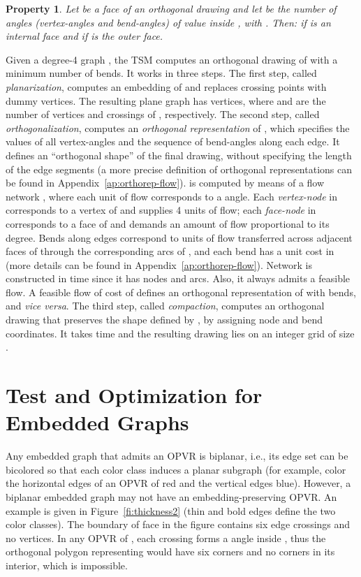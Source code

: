 \documentclass{article}
\newtheorem{property}{Property}
\newcommand{\opvr}{OPVR\xspace}
\begin{document}
\begin{property}\label{pr:face}
Let  be a face of an orthogonal drawing and let  be the number of angles (vertex-angles and bend-angles) of value  inside , with . Then:
 if  is an internal face and  if  is the outer face.
\end{property}

Given a degree-4 graph , the TSM computes an orthogonal drawing  of  with a minimum number of bends. It works in three steps. The first step, called \emph{planarization}, computes an embedding of  and replaces crossing points with dummy vertices. The resulting plane graph  has  vertices, where  and  are the number of vertices and crossings of , respectively. The second step, called \emph{orthogonalization}, computes an \emph{orthogonal representation}  of , which specifies the values of all vertex-angles and the sequence of bend-angles along each edge. It defines an ``orthogonal shape'' of the final drawing, without specifying the length of the edge segments (a more precise definition of orthogonal representations can be found in Appendix~\ref{ap:orthorep-flow}).  is computed by means of a flow network , where each unit of flow corresponds to a  angle. Each \emph{vertex-node} in  corresponds to a vertex of  and  supplies 4 units of flow; each \emph{face-node} in  corresponds to a face of  and demands an amount of flow proportional to its degree. Bends along edges correspond to units of flow transferred across adjacent faces of  through the corresponding arcs of , and each bend has a unit cost in  (more details can be found in Appendix~\ref{ap:orthorep-flow}). Network  is constructed in  time since it has  nodes and arcs. Also, it always admits a feasible flow. A feasible flow  of cost  of  defines an orthogonal representation  of  with  bends, and \emph{vice versa}. The third step, called \emph{compaction}, computes an orthogonal drawing that preserves the shape defined by , by assigning node and bend coordinates. It takes  time and the resulting drawing lies on an integer grid of size .


\section{Test and Optimization for Embedded Graphs}\label{se:characterization}


Any embedded graph  that admits an \opvr is biplanar, i.e., its edge set can be bicolored so that each color class induces a planar subgraph (for example, color the horizontal edges of an \opvr of  red and the vertical edges blue). However, a biplanar embedded graph  may not have an embedding-preserving \opvr. An example is given in Figure~\ref{fi:thickness2} (thin and bold edges define the two color classes). The boundary of face  in the figure contains six edge crossings and no vertices. In any \opvr of , each crossing forms a  angle inside , thus the orthogonal polygon representing  would have six  corners and no  corners in its interior, which is impossible.
\end{document}
